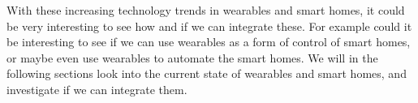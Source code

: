 With these increasing technology trends in wearables and smart homes, 
it could be very interesting to see how and if we can integrate these. 
For example could it be interesting to see if we can use wearables as a form of control of smart homes, 
or maybe even use wearables to automate the smart homes.
We will in the following sections look into the current state of wearables and smart homes, 
and investigate if we can integrate them. 
